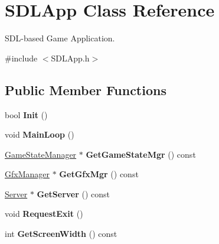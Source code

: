 \hypertarget{classSDLApp}{\section{S\-D\-L\-App Class Reference}
\label{classSDLApp}
}


S\-D\-L-\/based Game Application.  




{\ttfamily \#include $<$S\-D\-L\-App.\-h$>$}

\subsection*{Public Member Functions}
\begin{DoxyCompactItemize}
\item 
\hypertarget{classSDLApp_a72bd9a0859a065fd6a791bcc4e783343}{bool {\bfseries Init} ()}\label{classSDLApp_a72bd9a0859a065fd6a791bcc4e783343}

\item 
\hypertarget{classSDLApp_a058ffb4ebf4b0adac97546a1bc4df271}{void {\bfseries Main\-Loop} ()}\label{classSDLApp_a058ffb4ebf4b0adac97546a1bc4df271}

\item 
\hypertarget{classSDLApp_a29d6c084d2b3375aafa995c89aa6507c}{\hyperlink{classGameStateManager}{Game\-State\-Manager} $\ast$ {\bfseries Get\-Game\-State\-Mgr} () const }\label{classSDLApp_a29d6c084d2b3375aafa995c89aa6507c}

\item 
\hypertarget{classSDLApp_aa352d1b857b982e91e6c56241ae95b36}{\hyperlink{classGfxManager}{Gfx\-Manager} $\ast$ {\bfseries Get\-Gfx\-Mgr} () const }\label{classSDLApp_aa352d1b857b982e91e6c56241ae95b36}

\item 
\hypertarget{classSDLApp_ab90980220451368ea19b6b216e5b7a3c}{\hyperlink{classServer}{Server} $\ast$ {\bfseries Get\-Server} () const }\label{classSDLApp_ab90980220451368ea19b6b216e5b7a3c}

\item 
\hypertarget{classSDLApp_aab8bec057c4b8e313a262e4ba1d7e6ef}{void {\bfseries Request\-Exit} ()}\label{classSDLApp_aab8bec057c4b8e313a262e4ba1d7e6ef}

\item 
\hypertarget{classSDLApp_a90723ed35a9aa590f8d122ab8d8b1b0c}{int {\bfseries Get\-Screen\-Width} () const }\label{classSDLApp_a90723ed35a9aa590f8d122ab8d8b1b0c}


\end{DoxyCompactItemize}
